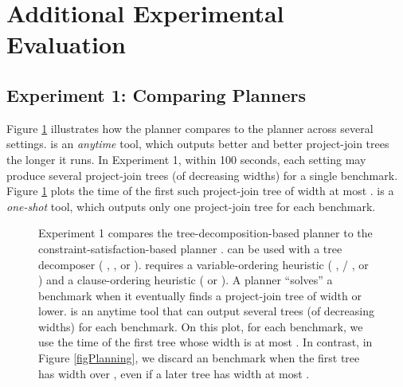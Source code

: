 





\section{Additional Experimental Evaluation}
\label{appendix:exp}


\subsection{Experiment 1: Comparing Planners}

Figure \ref{figPlanningA} illustrates how the planner \Lg{} compares to the planner \htb{} across several settings.
\Lg{} is an \emph{anytime} tool, which outputs better and better project-join trees the longer it runs.
In Experiment 1, within 100 seconds, each \Lg{} setting may produce several project-join trees (of decreasing widths) for a single benchmark.
Figure \ref{figPlanningA} plots the time of the first such project-join tree of width at most \maxWidth.
\htb{} is a \emph{one-shot} tool, which outputs only one project-join tree for each benchmark.
\begin{figure}[H]
    \centering
    
    \caption{
        Experiment 1 compares the tree-decomposition-based planner \Lg{} to the constraint-satisfaction-based planner \htb{}. 
        \Lg{} can be used with a tree decomposer (\flowcutter{} \cite{strasser2017computing}, \htd{} \cite{abseher2017htd}, or \tamaki{} \cite{tamaki2019positive}).
        \htb{} requires a variable-ordering heuristic (\mcs{} \cite{tarjan1984simple}, \lexp/\lexm{} \cite{koster2001treewidth}, or \minfill{} \cite{dechter2003constraint}) and a clause-ordering heuristic (\be{} \cite{dechter1999bucket} or \bm{} \cite{bouquet1999gestion}).
        A planner ``solves'' a benchmark when it eventually finds a project-join tree of width \maxWidth{} or lower.
        \Lg{} is an anytime tool that can output several trees (of decreasing widths) for each benchmark.
        On this plot, for each \Lg{} benchmark, we use the time of the first tree whose width is at most \maxWidth.
        In contrast, in Figure \ref{figPlanning}, we discard an \Lg{} benchmark when the first tree has width over \maxWidth, even if a later tree has width at most \maxWidth.
    }
    \label{figPlanningA}
\end{figure}

